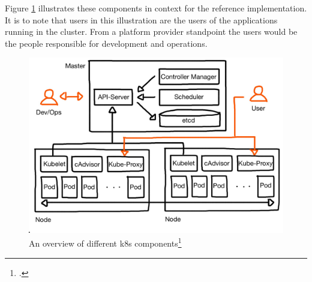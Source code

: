 Figure \ref{fig:k8s-big-picture} illustrates these components in context for the reference implementation. It is to note that users in this illustration are the users of the applications running in the cluster. From a platform provider standpoint the users would be the people responsible for development and operations. 

\begin{figure}
\centering
\includegraphics[scale=0.2]{pictures/big-picture.JPG}
\caption{An overview of different \gls{k8s} components\protect\footcite{nicoPictures}}
\label{fig:k8s-big-picture}
\end{figure}



